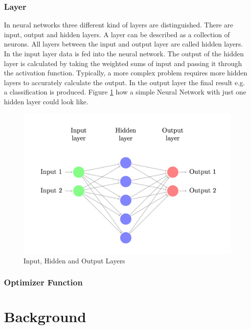 \subsubsection{Layer}
In neural networks three different kind of layers are distinguished. There are input, output and hidden layers. A layer can be described as a collection of neurons. All layers between the input and output layer are called hidden layers. In the input layer data is fed into the neural network. The output of the hidden layer is calculated by taking the weighted sums of input and passing it through the activation function. Typically, a more complex problem requires more hidden layers to accurately calculate the output. In the output layer the final result e.g. a classification is produced. Figure \ref{fig:layers} how a simple Neural Network with just one hidden layer could look like.


\begin{figure}[h]
	\centering
	\includegraphics[scale=0.3]{Figures/layers}
	\decoRule
	\caption[Layers]{Input, Hidden and Output Layers \parencite{DennyBritz2015}}
	\label{fig:layers}
\end{figure}



\subsubsection{Optimizer Function}


\section{Background}

